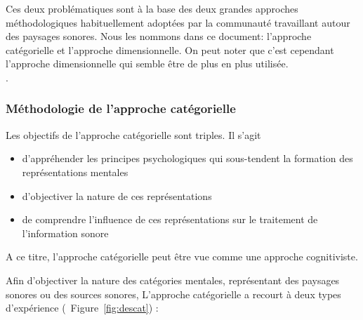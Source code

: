 Ces deux problématiques sont à la base des deux grandes approches méthodologiques habituellement adoptées par la communauté travaillant autour des paysages sonores. Nous les nommons dans ce document: l'approche catégorielle et l'approche dimensionnelle.
On peut noter que c'est cependant l'approche dimensionnelle qui semble être de plus en plus utilisée.  \\

.\\

\subsubsection{Méthodologie de l'approche catégorielle}
\label{sec:appCategorielle}

Les objectifs de l'approche catégorielle sont triples. Il s'agit 

\begin{itemize}
\item d'appréhender les principes psychologiques qui sous-tendent la formation des représentations mentales
\item d'objectiver la nature de ces représentations
\item de comprendre l'influence de ces représentations sur le traitement de l'information sonore
\end{itemize}
 
A ce titre, l'approche catégorielle peut être vue comme une approche cognitiviste. 

Afin d'objectiver la nature des catégories mentales, représentant des paysages sonores ou des sources sonores, L'approche catégorielle a recourt à deux types d'expérience (\Cf~Figure~\ref{fig:descat}) :

